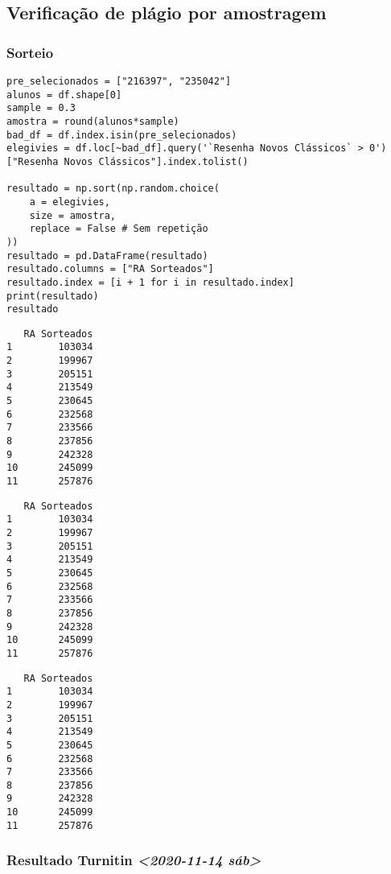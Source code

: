 \documentclass[11pt]{article}
\begin{document}
\subsection{Verificação de plágio por amostragem}
\label{sec:org2a61c9f}
\subsubsection{Sorteio}
\label{sec:org036dcd0}

\begin{verbatim}
pre_selecionados = ["216397", "235042"]
alunos = df.shape[0]
sample = 0.3
amostra = round(alunos*sample)
bad_df = df.index.isin(pre_selecionados)
elegivies = df.loc[~bad_df].query('`Resenha Novos Clássicos` > 0')["Resenha Novos Clássicos"].index.tolist()

resultado = np.sort(np.random.choice(
    a = elegivies,
    size = amostra,
    replace = False # Sem repetição
))
resultado = pd.DataFrame(resultado)
resultado.columns = ["RA Sorteados"]
resultado.index = [i + 1 for i in resultado.index]
print(resultado)
resultado
\end{verbatim}

\begin{verbatim}
   RA Sorteados
1        103034
2        199967
3        205151
4        213549
5        230645
6        232568
7        233566
8        237856
9        242328
10       245099
11       257876
\end{verbatim}
\begin{verbatim}
   RA Sorteados
1        103034
2        199967
3        205151
4        213549
5        230645
6        232568
7        233566
8        237856
9        242328
10       245099
11       257876
\end{verbatim}
\begin{verbatim}
   RA Sorteados
1        103034
2        199967
3        205151
4        213549
5        230645
6        232568
7        233566
8        237856
9        242328
10       245099
11       257876
\end{verbatim}



\subsubsection{Resultado Turnitin \textit{<2020-11-14 sáb>}}
\label{sec:org4eacc30}
\end{document}
